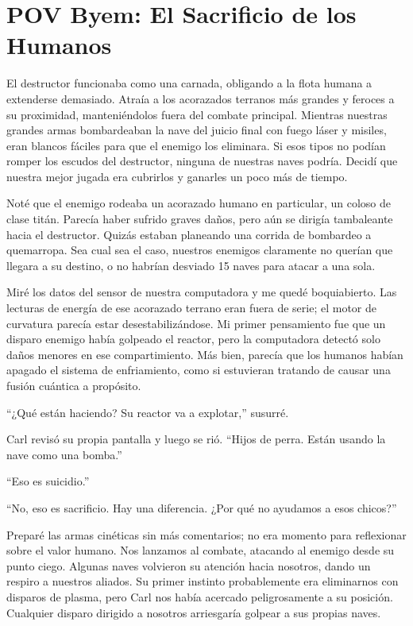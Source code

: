 \chapter{POV Byem: El Sacrificio de los Humanos}

El destructor funcionaba como una carnada, obligando a la flota humana a extenderse demasiado. Atraía a los acorazados terranos más grandes y feroces a su proximidad, manteniéndolos fuera del combate principal. Mientras nuestras grandes armas bombardeaban la nave del juicio final con fuego láser y misiles, eran blancos fáciles para que el enemigo los eliminara. Si esos tipos no podían romper los escudos del destructor, ninguna de nuestras naves podría. Decidí que nuestra mejor jugada era cubrirlos y ganarles un poco más de tiempo.

Noté que el enemigo rodeaba un acorazado humano en particular, un coloso de clase titán. Parecía haber sufrido graves daños, pero aún se dirigía tambaleante hacia el destructor. Quizás estaban planeando una corrida de bombardeo a quemarropa. Sea cual sea el caso, nuestros enemigos claramente no querían que llegara a su destino, o no habrían desviado 15 naves para atacar a una sola.

Miré los datos del sensor de nuestra computadora y me quedé boquiabierto. Las lecturas de energía de ese acorazado terrano eran fuera de serie; el motor de curvatura parecía estar desestabilizándose. Mi primer pensamiento fue que un disparo enemigo había golpeado el reactor, pero la computadora detectó solo daños menores en ese compartimiento. Más bien, parecía que los humanos habían apagado el sistema de enfriamiento, como si estuvieran tratando de causar una fusión cuántica a propósito.

“¿Qué están haciendo? Su reactor va a explotar,” susurré.

Carl revisó su propia pantalla y luego se rió. “Hijos de perra. Están usando la nave como una bomba.”

“Eso es suicidio.”

“No, eso es sacrificio. Hay una diferencia. ¿Por qué no ayudamos a esos chicos?”

Preparé las armas cinéticas sin más comentarios; no era momento para reflexionar sobre el valor humano. Nos lanzamos al combate, atacando al enemigo desde su punto ciego. Algunas naves volvieron su atención hacia nosotros, dando un respiro a nuestros aliados. Su primer instinto probablemente era eliminarnos con disparos de plasma, pero Carl nos había acercado peligrosamente a su posición. Cualquier disparo dirigido a nosotros arriesgaría golpear a sus propias naves.

